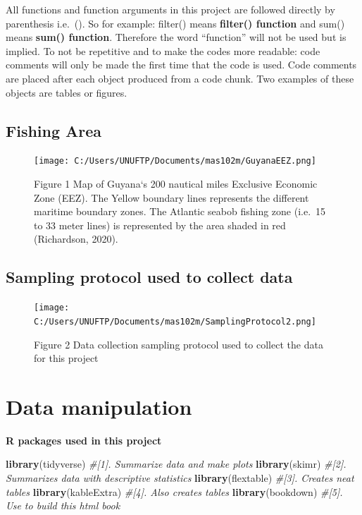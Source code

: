 \documentclass[
]{book}
\newenvironment{Shaded}{\begin{snugshade}}{\end{snugshade}}
\newcommand{\CommentTok}[1]{\textcolor[rgb]{0.56,0.35,0.01}{\textit{#1}}}
\newcommand{\KeywordTok}[1]{\textcolor[rgb]{0.13,0.29,0.53}{\textbf{#1}}}
\newcommand{\NormalTok}[1]{#1}
\begin{document}
All functions and function arguments in this project are followed directly by parenthesis i.e.~(). So for example: filter() means \textbf{filter() function} and sum() means \textbf{sum() function}. Therefore the word ``function'' will not be used but is implied. To not be repetitive and to make the codes more readable: code comments will only be made the first time that the code is used. Code comments are placed after each object produced from a code chunk. Two examples of these objects are tables or figures.

\hypertarget{fishing-area}{%
\subsection{Fishing Area}\label{fishing-area}}

\begin{figure}
\centering
\texttt{[image: C:/Users/UNUFTP/Documents/mas102m/GuyanaEEZ.png]}
\caption{Figure 1 Map of Guyana`s 200 nautical miles Exclusive Economic Zone (EEZ). The Yellow boundary lines represents the different maritime boundary zones. The Atlantic seabob fishing zone (i.e.~15 to 33 meter lines) is represented by the area shaded in red (Richardson, 2020).}
\end{figure}

\hypertarget{sampling-protocol-used-to-collect-data}{%
\subsection{Sampling protocol used to collect data}\label{sampling-protocol-used-to-collect-data}}

\begin{figure}
\centering
\texttt{[image: C:/Users/UNUFTP/Documents/mas102m/SamplingProtocol2.png]}
\caption{Figure 2 Data collection sampling protocol used to collect the data for this project}
\end{figure}

\hypertarget{data-manipulation}{%
\section{Data manipulation}\label{data-manipulation}}

\textbf{R packages used in this project}

\begin{Shaded}
\begin{Highlighting}[]
\KeywordTok{library}\NormalTok{(tidyverse) }\CommentTok{#[1]. Summarize data and make plots}
\KeywordTok{library}\NormalTok{(skimr) }\CommentTok{#[2]. Summarizes data with descriptive statistics}
\KeywordTok{library}\NormalTok{(flextable) }\CommentTok{#[3]. Creates neat tables }
\KeywordTok{library}\NormalTok{(kableExtra) }\CommentTok{#[4]. Also creates tables }
\KeywordTok{library}\NormalTok{(bookdown) }\CommentTok{#[5]. Use to build this html book}
\end{Highlighting}
\end{Shaded}
\end{document}
